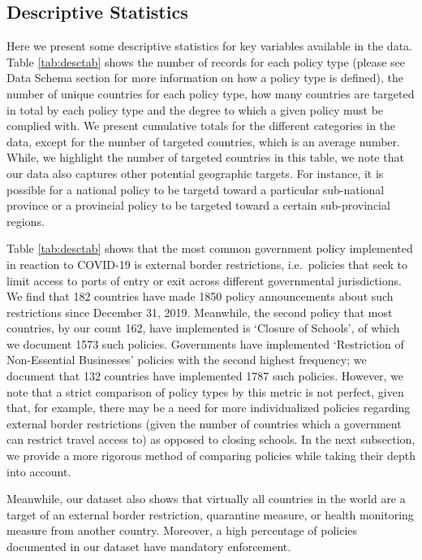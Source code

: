 \documentclass[
]{article}
\begin{document}
\hypertarget{descriptive-statistics}{%
\subsection*{Descriptive Statistics}\label{descriptive-statistics}}

Here we present some descriptive statistics for key variables available in the data. Table \ref{tab:desctab} shows the number of records for each policy type (please see Data Schema section for more information on how a policy type is defined), the number of unique countries for each policy type, how many countries are targeted in total by each policy type and the degree to which a given policy must be complied with. We present cumulative totals for the different categories in the data, except for the number of targeted countries, which is an average number. While, we highlight the number of targeted countries in this table, we note that our data also captures other potential geographic targets. For instance, it is possible for a national policy to be targetd toward a particular sub-national province or a provincial policy to be targeted toward a certain sub-provincial regions.

Table \ref{tab:desctab} shows that the most common government policy implemented in reaction to COVID-19 is external border restrictions, i.e.~policies that seek to limit access to ports of entry or exit across different governmental jurisdictions. We find that 182 countries have made 1850 policy announcements about such restrictions since December 31, 2019. Meanwhile, the second policy that most countries, by our count 162, have implemented is `Closure of Schools', of which we document 1573 such policies. Governments have implemented `Restriction of Non-Essential Businesses' policies with the second highest frequency; we document that 132 countries have implemented 1787 such policies. However, we note that a strict comparison of policy types by this metric is not perfect, given that, for example, there may be a need for more individualized policies regarding external border restrictions (given the number of countries which a government can restrict travel access to) as opposed to closing schools. In the next subsection, we provide a more rigorous method of comparing policies while taking their depth into account.

Meanwhile, our dataset also shows that virtually all countries in the world are a target of an external border restriction, quarantine measure, or health monitoring measure from another country. Moreover, a high percentage of policies documented in our dataset have mandatory enforcement.
\end{document}
